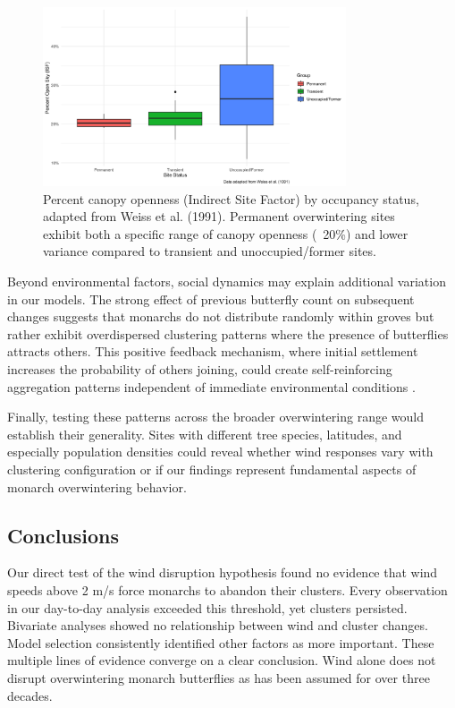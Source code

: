 \begin{figure}[h]
    \centering
    \includegraphics[width=0.8\textwidth]{figures/discussion/weiss_adapted_boxplot.png}
    \caption{Percent canopy openness (Indirect Site Factor) by occupancy status, adapted from Weiss et al. (1991). Permanent overwintering sites exhibit both a specific range of canopy openness (~20\%) and lower variance compared to transient and unoccupied/former sites.}
    \label{fig:weiss_canopy}
\end{figure}

Beyond environmental factors, social dynamics may explain additional variation in our models. The strong effect of previous butterfly count on subsequent changes suggests that monarchs do not distribute randomly within groves but rather exhibit overdispersed clustering patterns where the presence of butterflies attracts others. This positive feedback mechanism, where initial settlement increases the probability of others joining, could create self-reinforcing aggregation patterns independent of immediate environmental conditions \parencite{berdahlEmergentSensingComplex2013}.

Finally, testing these patterns across the broader overwintering range would establish their generality. Sites with different tree species, latitudes, and especially population densities could reveal whether wind responses vary with clustering configuration or if our findings represent fundamental aspects of monarch overwintering behavior.

\subsection{Conclusions}

Our direct test of the wind disruption hypothesis found no evidence that wind speeds above 2 m/s force monarchs to abandon their clusters. Every observation in our day-to-day analysis exceeded this threshold, yet clusters persisted. Bivariate analyses showed no relationship between wind and cluster changes. Model selection consistently identified other factors as more important. These multiple lines of evidence converge on a clear conclusion. Wind alone does not disrupt overwintering monarch butterflies as has been assumed for over three decades.

